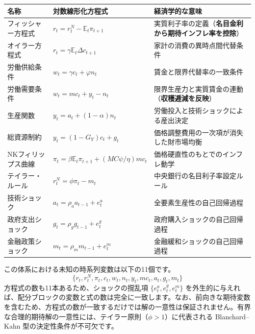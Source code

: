 \documentclass[
  japanese,
  lualatex,
  ja=standard,
  12pt,
  a4paper]{ltjsarticle}
\newcounter{none} %
\begin{document}
{\def\LTcaptype{none} %
\begin{longtable}[]{@{}
  >{\raggedright\arraybackslash}p{}
  >{\raggedright\arraybackslash}p{}
  >{\raggedright\arraybackslash}p{}@{}}
\toprule\noalign{}
\begin{minipage}[b]{\linewidth}\raggedright
名称
\end{minipage} & \begin{minipage}[b]{\linewidth}\raggedright
対数線形化方程式
\end{minipage} & \begin{minipage}[b]{\linewidth}\raggedright
経済学的な意味
\end{minipage} \\
\midrule\noalign{}
\endhead
\bottomrule\noalign{}
\endlastfoot
フィッシャー方程式 & \(r_t=r_t^N-\mathbb{E}_t\pi_{t+1}\) &
実質利子率の定義（\textbf{名目金利から期待インフレ率を控除}） \\
オイラー方程式 & \(r_t=\gamma\mathbb{E}_t\Delta c_{t+1}\) &
家計の消費の異時点間代替条件 \\
労働供給条件 & \(w_t=\gamma c_t+\varphi n_t\) &
賃金と限界代替率の一致条件 \\
労働需要条件 & \(w_t=mc_t+y_t-n_t\) &
限界生産力と実質賃金の連動（\textbf{収穫逓減を反映}） \\
生産関数 & \(y_t=a_t+(1-\alpha)n_t\) &
労働投入と技術ショックによる産出決定 \\
総資源制約 & \(y_t=(1-G_Y)c_t+g_t\) &
価格調整費用の一次項が消失した財市場均衡 \\
NKフィリップス曲線 &
\(\pi_t=\beta\mathbb{E}_t\pi_{t+1}+(MC\psi/\eta)mc_t\) &
価格硬直性のもとでのインフレ動学 \\
テイラー・ルール & \(r_t^N=\phi\pi_t-m_t\) &
中央銀行の名目利子率設定ルール \\
技術ショック & \(a_t=\rho_a a_{t-1}+e_t^a\) &
全要素生産性の自己回帰過程 \\
政府支出ショック & \(g_t=\rho_g g_{t-1}+e_t^g\) &
政府購入ショックの自己回帰過程 \\
金融政策ショック & \(m_t=\rho_m m_{t-1}+e_t^m\) &
金融緩和ショックの自己回帰過程 \\
\end{longtable}
}

\Needspace{0.26\textheight}

この体系における未知の時系列変数は以下の11個です。 \[
\{r_t,r_t^N,\pi_t,c_t,w_t,n_t,y_t,mc_t,a_t,g_t,m_t\}
\] 方程式の数も11本あるため、ショックの撹乱項
\(\{e_t^a, e_t^g, e_t^m\}\)
を外生的に与えれば、配分ブロックの変数と式の数は完全に一致します。なお、前向きな期待変数を含むため、方程式の数が一致するだけでは解の一意性は保証されません。有界な合理的期待解の一意性には、テイラー原則（\(\phi>1\)）に代表される
Blanchard--Kahn 型の決定性条件が不可欠です。
\end{document}
